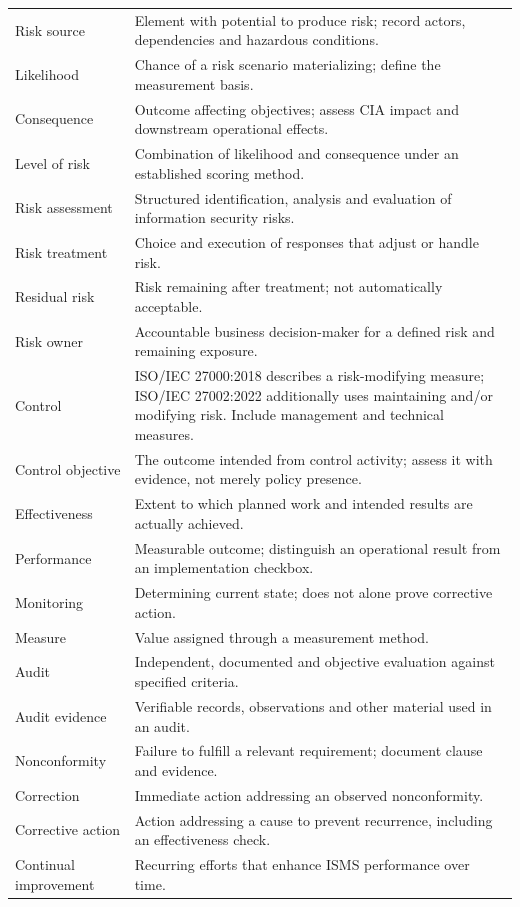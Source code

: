 \documentclass[11pt,letterpaper]{article}
\begin{document}
\begin{longtable}{>{\raggedright\arraybackslash}p{}>{\raggedright\arraybackslash}p{}}
Risk source & Element with potential to produce risk; record actors, dependencies and hazardous conditions.\\
Likelihood & Chance of a risk scenario materializing; define the measurement basis.\\
Consequence & Outcome affecting objectives; assess CIA impact and downstream operational effects.\\
Level of risk & Combination of likelihood and consequence under an established scoring method.\\
Risk assessment & Structured identification, analysis and evaluation of information security risks.\\
Risk treatment & Choice and execution of responses that adjust or handle risk.\\
Residual risk & Risk remaining after treatment; not automatically acceptable.\\
Risk owner & Accountable business decision-maker for a defined risk and remaining exposure.\\
Control & ISO/IEC 27000:2018 describes a risk-modifying measure; ISO/IEC 27002:2022 additionally uses maintaining and/or modifying risk. Include management and technical measures.\\
Control objective & The outcome intended from control activity; assess it with evidence, not merely policy presence.\\
Effectiveness & Extent to which planned work and intended results are actually achieved.\\
Performance & Measurable outcome; distinguish an operational result from an implementation checkbox.\\
Monitoring & Determining current state; does not alone prove corrective action.\\
Measure & Value assigned through a measurement method.\\
Audit & Independent, documented and objective evaluation against specified criteria.\\
Audit evidence & Verifiable records, observations and other material used in an audit.\\
Nonconformity & Failure to fulfill a relevant requirement; document clause and evidence.\\
Correction & Immediate action addressing an observed nonconformity.\\
Corrective action & Action addressing a cause to prevent recurrence, including an effectiveness check.\\
Continual improvement & Recurring efforts that enhance ISMS performance over time.\\

\end{longtable}
\end{document}
